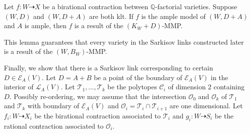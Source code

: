 \begin{lemma}
  \cite[Lemma 3.6]{haconSarkisovProgram2012} Let $f:W\dashrightarrow X $ be a birational contraction between $\mathbb{Q}$-factorial varieties. Suppose $(W,D)$ and $(W,D+A)$ are both klt. If $f$ is the ample model of $(W,D+A)$ and $A$ is ample, then $f$ is a result of the  $(K_{W}+D)$-MMP.
\end{lemma}

This lemma guarantees that every variety in the Sarkisov links constructed later is a result of the $(W, B_{W})$-MMP.

Finally, we show that there is a Sarkisov link corresponding to certain $D \in \mathcal{E}_{A}(V)$. Let $ D=A+B $ be a point of the boundary of $ \mathcal{E}_A(V) $ in the interior of $ \mathcal{L}_A(V) $. Let $ \mathcal{T}_1, \ldots, \mathcal{T}_k $ be the polytopes $ \mathcal{C}_i $ of dimension $ 2 $ containing $ D $. Possibly re-ordering, we may assume that  the intersection  $ \mathcal{O}_0 $ and $ \mathcal{O}_k $ of $ \mathcal{T}_1 $ and $ \mathcal{T}_k $ with boundary of $ \mathcal{E}_A(V) $ and  $ \mathcal{O}_i=\mathcal{T}_i\cap\mathcal{T}_{i+1} $ are one dimensional. Let $ f_i:W\dashrightarrow  X_i $ be the birational contraction associated to $ \mathcal{T}_i $ and $ g_i:W\dashrightarrow  S_i $ be the rational contraction associated to $ \mathcal{O}_i $.
\begin{center}
\end{center}

